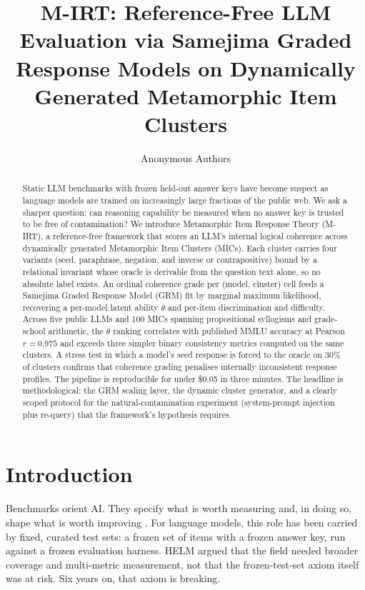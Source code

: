 \documentclass[11pt,letterpaper]{article}
\title{\textbf{M-IRT: Reference-Free LLM Evaluation via Samejima Graded Response Models on Dynamically Generated Metamorphic Item Clusters}}
\author{Anonymous Authors}
\date{}
\begin{document}
\maketitle

\begin{abstract}
Static LLM benchmarks with frozen held-out answer keys have become suspect as language models are trained on increasingly large fractions of the public web. We ask a sharper question: can reasoning capability be measured when no answer key is trusted to be free of contamination? We introduce Metamorphic Item Response Theory (M-IRT), a reference-free framework that scores an LLM's internal logical coherence across dynamically generated Metamorphic Item Clusters (MICs). Each cluster carries four variants (seed, paraphrase, negation, and inverse or contrapositive) bound by a relational invariant whose oracle is derivable from the question text alone, so no absolute label exists. An ordinal coherence grade per (model, cluster) cell feeds a Samejima Graded Response Model (GRM) fit by marginal maximum likelihood, recovering a per-model latent ability $\theta$ and per-item discrimination and difficulty. Across five public LLMs and 100 MICs spanning propositional syllogisms and grade-school arithmetic, the $\theta$ ranking correlates with published MMLU accuracy at Pearson $r = 0.975$ and exceeds three simpler binary consistency metrics computed on the same clusters. A stress test in which a model's seed response is forced to the oracle on 30\% of clusters confirms that coherence grading penalises internally inconsistent response profiles. The pipeline is reproducible for under \$0.05 in three minutes. The headline is methodological: the GRM scaling layer, the dynamic cluster generator, and a clearly scoped protocol for the natural-contamination experiment (system-prompt injection plus re-query) that the framework's hypothesis requires.
\end{abstract}

\section{Introduction}

Benchmarks orient AI. They specify what is worth measuring and, in doing so, shape what is worth improving \citep{Liang2022}. For language models, this role has been carried by fixed, curated test sets: a frozen set of items with a frozen answer key, run against a frozen evaluation harness. HELM argued that the field needed broader coverage and multi-metric measurement, not that the frozen-test-set axiom itself was at risk. Six years on, that axiom is breaking.
\end{document}
